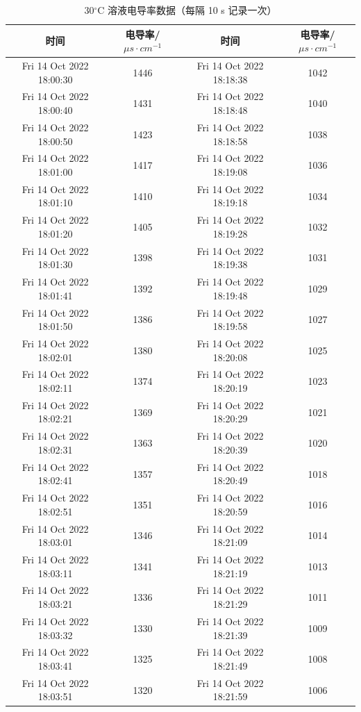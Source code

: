 \documentclass[12pt]{ctexart}
\numberwithin{equation}{section}
\begin{document}
\begin{longtable}{cc|cc}
    \caption{30$^\circ$C 溶液电导率数据（每隔 10 s 记录一次）} \\
    \hline
    时间 & 电导率/$\mu s\cdot cm^{-1}$ & 时间 & 电导率/$\mu s\cdot cm^{-1}$ \\
    \hline
    Fri 14 Oct 2022 18:00:30 & 1446 & Fri 14 Oct 2022 18:18:38 & 1042 \\
Fri 14 Oct 2022 18:00:40 & 1431 & Fri 14 Oct 2022 18:18:48 & 1040 \\
Fri 14 Oct 2022 18:00:50 & 1423 & Fri 14 Oct 2022 18:18:58 & 1038 \\
Fri 14 Oct 2022 18:01:00 & 1417 & Fri 14 Oct 2022 18:19:08 & 1036 \\
Fri 14 Oct 2022 18:01:10 & 1410 & Fri 14 Oct 2022 18:19:18 & 1034 \\
Fri 14 Oct 2022 18:01:20 & 1405 & Fri 14 Oct 2022 18:19:28 & 1032 \\
Fri 14 Oct 2022 18:01:30 & 1398 & Fri 14 Oct 2022 18:19:38 & 1031 \\
Fri 14 Oct 2022 18:01:41 & 1392 & Fri 14 Oct 2022 18:19:48 & 1029 \\
Fri 14 Oct 2022 18:01:50 & 1386 & Fri 14 Oct 2022 18:19:58 & 1027 \\
Fri 14 Oct 2022 18:02:01 & 1380 & Fri 14 Oct 2022 18:20:08 & 1025 \\
Fri 14 Oct 2022 18:02:11 & 1374 & Fri 14 Oct 2022 18:20:19 & 1023 \\
Fri 14 Oct 2022 18:02:21 & 1369 & Fri 14 Oct 2022 18:20:29 & 1021 \\
Fri 14 Oct 2022 18:02:31 & 1363 & Fri 14 Oct 2022 18:20:39 & 1020 \\
Fri 14 Oct 2022 18:02:41 & 1357 & Fri 14 Oct 2022 18:20:49 & 1018 \\
Fri 14 Oct 2022 18:02:51 & 1351 & Fri 14 Oct 2022 18:20:59 & 1016 \\
Fri 14 Oct 2022 18:03:01 & 1346 & Fri 14 Oct 2022 18:21:09 & 1014 \\
Fri 14 Oct 2022 18:03:11 & 1341 & Fri 14 Oct 2022 18:21:19 & 1013 \\
Fri 14 Oct 2022 18:03:21 & 1336 & Fri 14 Oct 2022 18:21:29 & 1011 \\
Fri 14 Oct 2022 18:03:32 & 1330 & Fri 14 Oct 2022 18:21:39 & 1009 \\
Fri 14 Oct 2022 18:03:41 & 1325 & Fri 14 Oct 2022 18:21:49 & 1008 \\
Fri 14 Oct 2022 18:03:51 & 1320 & Fri 14 Oct 2022 18:21:59 & 1006 \\

\end{longtable}
\end{document}
